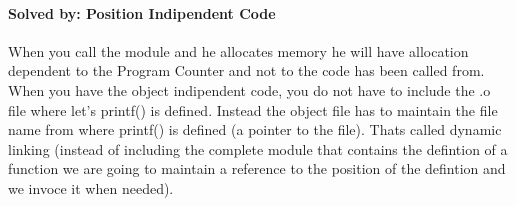 \documentclass{article}
\begin{document}
    \paragraph{Solved by: Position Indipendent Code} When you call the module and he 
      allocates memory he will have allocation dependent to the Program Counter
      and not to the code has been called from. 
    When you have the object indipendent code, you do not have to include the .o file 
    where let's printf() is defined. Instead the object file has to maintain the file
    name from where printf() is defined (a pointer to the file). Thats called dynamic 
    linking (instead of including the complete module that contains the defintion of 
    a function we are going to maintain a reference to the position of the defintion 
    and we invoce it when needed).
\end{document}
